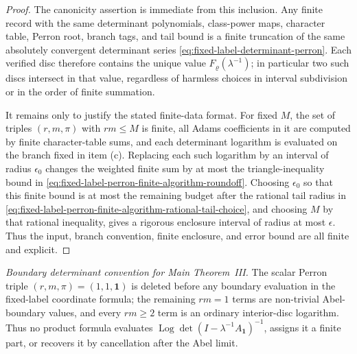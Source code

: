 \documentclass[11pt,a4paper]{amsart}
\theoremstyle{plain}
\theoremstyle{definition}
\theoremstyle{remark}
\DeclareMathOperator{\Log}{Log}
\begin{document}
\begin{proof}
  The canonicity assertion is immediate from this inclusion.  Any finite
  record with the same determinant polynomials, class-power maps, character
  table, Perron root, branch tags, and tail bound is a finite truncation of the
  same absolutely convergent determinant series
  \eqref{eq:fixed-label-determinant-perron}.  Each verified disc therefore
  contains the unique value \(F_\varrho(\lambda^{-1})\); in particular two such
  discs intersect in that value, regardless of harmless choices in interval
  subdivision or in the order of finite summation.

  It remains only to justify the stated finite-data format.  For fixed
  \(M\), the set of triples \((r,m,\pi)\) with \(rm\le M\) is finite, all
  Adams coefficients in it are computed by finite character-table sums, and
  each determinant logarithm is evaluated on the branch fixed in item (c).
  Replacing each such logarithm by an interval of radius \(\epsilon_0\) changes
  the weighted finite sum by at most the triangle-inequality bound in
  \eqref{eq:fixed-label-perron-finite-algorithm-roundoff}.  Choosing
  \(\epsilon_0\) so that this finite bound is at most the remaining budget
  after the rational tail radius in
  \eqref{eq:fixed-label-perron-finite-algorithm-rational-tail-choice}, and
  choosing \(M\) by that rational inequality, gives a rigorous enclosure interval
  of radius at most \(\epsilon\).  Thus the input, branch convention, finite
  enclosure, and error bound are all finite and explicit.
\end{proof}

\noindent\textit{Boundary determinant convention for Main Theorem~III.}
The scalar Perron triple \((r,m,\pi)=(1,1,\mathbf1)\) is deleted before any
boundary evaluation in the fixed-label coordinate formula; the remaining
\(rm=1\) terms are non-trivial Abel-boundary values, and every \(rm\ge2\)
term is an ordinary interior-disc logarithm.  Thus no product formula evaluates
\(\Log\det(I-\lambda^{-1}A_{\mathbf1})^{-1}\), assigns it a finite part, or
recovers it by cancellation after the Abel limit.
\end{document}
